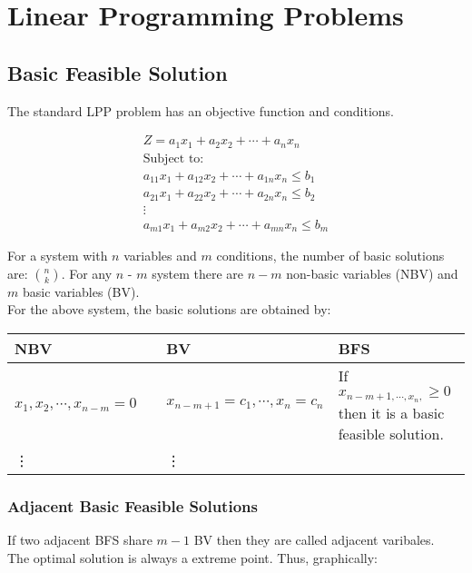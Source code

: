 \chapter{Linear Programming Problems}
\section{Basic Feasible Solution}
The standard LPP problem has an objective function and conditions.
\begin{center}
	\begin{align*}
		Z = a_1 x_1 + a_2 x_2 + \cdots + a_n x_n\\
		\text{Subject to:}\\
		a_{11} x_{1} + a_{12} x_{2} + \cdots + a_{1n}x_n \leq b_1\\
		a_{21} x_{1} + a_{22} x_{2} + \cdots + a_{2n}x_n \leq b_2\\
		\vdots\\
		a_{m1} x_{1} + a_{m2} x_{2} + \cdots + a_{mn}x_n \leq b_m
	\end{align*}
\end{center}
For a system with $n$ variables and $m$ conditions, the number of basic solutions are: ${n\choose k}$.
For any $n$ - $m$ system there are $n-m$ non-basic variables (NBV) and $m$ basic variables (BV).\\
For the above system, the basic solutions are obtained by:\\
\begin{table}[ht]
	\centering
	\begin{tabular}{p{0.35\linewidth}  p{0.35\linewidth} p{0.3\linewidth} }
		\toprule
		NBV & BV & BFS\\
		\midrule
		$x_1,x_2,\cdots,x_{n-m} = 0$ & $x_{n-m+1} = c_1, \cdots , x_n = c_n$ & If $x_{n-m+1, \cdots , x_n,} \geq 0$ then it is a basic feasible solution.\\
		\vdots & \vdots & \\
		\bottomrule
	\end{tabular}
\end{table}

\subsection{Adjacent Basic Feasible Solutions}
If two adjacent BFS share $m-1$ BV then they are called adjacent varibales.\\
The optimal solution is always a extreme point. Thus, graphically:

